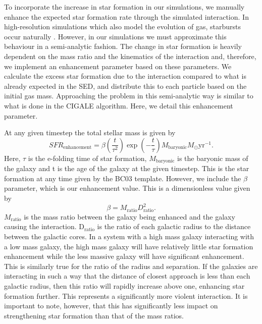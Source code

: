 To incorporate the increase in star formation in our simulations, we manually enhance the expected star formation rate through the simulated interaction. In high-resolution simulations which also model the evolution of gas, starbursts occur naturally \citep{2009PASJ...61..481S}. However, in our simulations we must approximate this behaviour in a semi-analytic fashion. The change in star formation is heavily dependent on the mass ratio and the kinematics of the interaction and, therefore, we implement an enhancement parameter based on these parameters. We calculate the excess star formation due to the interaction compared to what is already expected in the SED, and distribute this to each particle based on the initial gas mass. Approaching the problem in this semi-analytic way is similar to what is done in the CIGALE \citep{2019A&A...622A.103B} algorithm. Here, we detail this enhancement parameter.

At any given timestep the total stellar mass is given by
\begin{equation}\label{Total_SFR}
SFR_{\text{enhancement}} = \beta (\frac{t}{\tau^{2}}) \exp(-\frac{t}{\tau}) M_{\text{baryonic}} M_{\odot} \text{yr}^{-1}.
\end{equation}
Here, $\tau$ is the e-folding time of star formation, $M_{\text{baryonic}}$ is the baryonic mass of the galaxy and t is the age of the galaxy at the given timestep. This is the star formation at any time given by the BC03 template. However, we include the $\beta$ parameter, which is our enhancement value. This is a dimensionless value given by
\begin{equation}\label{enhancement_param}
\beta = M_{\text{ratio}} D_{\text{ratio}}^{2}.
\end{equation}
$M_{\text{ratio}}$ is the mass ratio between the galaxy being enhanced and the galaxy causing the interaction. D$_{\text{ratio}}$ is the ratio of each galactic radius to the distance between the galactic cores. In a system with a high mass galaxy interacting with a low mass galaxy, the high mass galaxy will have relatively little star formation enhancement while the less massive galaxy will have significant enhancement. This is similarly true for the ratio of the radius and separation. If the galaxies are interacting in such a way that the distance of closest approach is less than each galactic radius, then this ratio will rapidly increase above one, enhancing star formation further. This represents a significantly more violent interaction. It is important to note, however, that this has significantly less impact on strengthening star formation than that of the mass ratios. 


